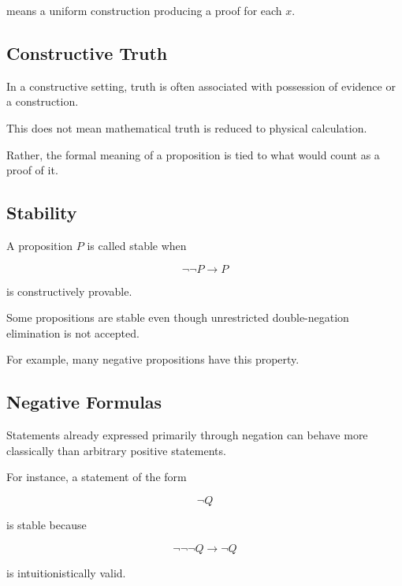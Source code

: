 means a uniform construction producing a proof for each \(x\).

\subsection{Constructive Truth}
\label{subsec:constructive-truth}

In a constructive setting, truth is often associated with possession of
evidence or a construction.

This does not mean mathematical truth is reduced to physical calculation.

Rather, the formal meaning of a proposition is tied to what would count as
a proof of it.

\subsection{Stability}
\label{subsec:constructive-stability}

A proposition \(P\) is called stable when

\[
\boxed{
\neg\neg P
\rightarrow
P
}
\]

is constructively provable.

Some propositions are stable even though unrestricted double-negation
elimination is not accepted.

For example, many negative propositions have this property.

\subsection{Negative Formulas}
\label{subsec:negative-formulas-constructive}

Statements already expressed primarily through negation can behave more
classically than arbitrary positive statements.

For instance, a statement of the form

\[
\boxed{
\neg Q
}
\]

is stable because

\[
\neg\neg\neg Q
\rightarrow
\neg Q
\]

is intuitionistically valid.

